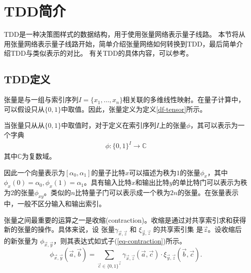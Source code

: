 \section{TDD简介}
TDD是一种决策图样式的数据结构，用于使用张量网络表示量子线路。
本节将从用张量网络表示量子线路开始，简单介绍张量网络如何转换到TDD，最后简单介绍TDD与类似表示的对比。
有关TDD的具体内容，可以参考\citep{Hong_2022}。
\subsection{TDD定义}
张量是与一组与索引序列\(I=\{x_1,\ldots,x_n\}\)相关联的多维线性映射。在量子计算中，可以假设只从\(\{0,1\}\)中取值。因此，张量定义为定义\ref{df-tensor}所示。
\begin{definition}\citep{biamonte2019lectures}
    \label{df-tensor}
    当张量只从从\(\{0,1\}\)中取值时，对于定义在索引序列\(I\)上的张量\(\phi\)，其可以表示为一个字典
    \begin{align}
        \phi :{\{0,1\}}^I\rightarrow\mathbb{C}
    \end{align}
    其中\(\mathbb{C}\)为复数域。
\end{definition}


因此一个向量表示为$[\alpha_0,\alpha_1]$的量子比特$x$可以描述为秩为$1$的张量$\phi_x$，其中$\phi_x\left(0\right)=\alpha_0, \phi_x\left(1\right)=\alpha_1$。具有输入比特$x$和输出比特$y$的单比特门可以表示为秩为$2$的张量$\phi_{xy}$。类似的$n$比特量子门可以表示成一个秩为$2n$的张量。在张量表示中，一般不区分输入和输出索引。

张量之间最重要的运算之一是收缩(contraction)。收缩是通过对共享索引求和获得新的张量的操作。具体来说，设 张量$\gamma_{\overrightarrow{x},\overrightarrow{z}}$ 和 $\xi_{\overrightarrow{y},\overrightarrow{z}}$ 的共享索引集 是$\overrightarrow{z}$。设收缩后的新张量为 $\phi_{\overrightarrow{x},\overrightarrow{y}}$，则其表达式如式子(\ref{eq-contraction})所示。
\begin{equation}
\label{eq-contraction}
\phi_{\overrightarrow{x},\overrightarrow{y}}(\overrightarrow{a},\overrightarrow{b}) = \sum_{\overrightarrow{c} \in \{0,1\}^{\overrightarrow{z}}} \gamma_{\overrightarrow{x},\overrightarrow{z}}(\overrightarrow{a}, \overrightarrow{c}) \cdot \xi_{\overrightarrow{y},\overrightarrow{z}}(\overrightarrow{b}, \overrightarrow{c}).
\end{equation}

